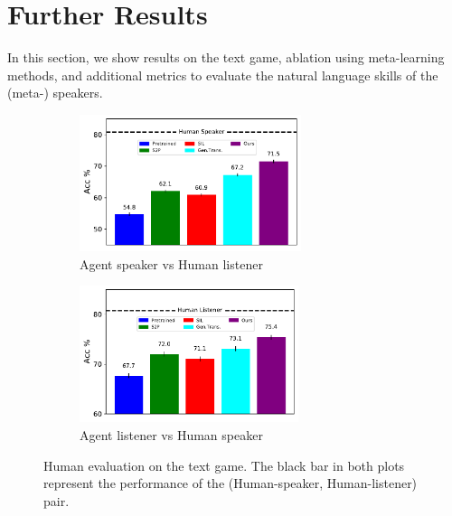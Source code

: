 \documentclass{article}
\begin{document}
\section{Further Results}
\label{subsec:app-res}
In this section, we show results on the text game, ablation using meta-learning methods, and additional metrics to evaluate the natural language skills of the (meta-) speakers.

\begin{figure}
    \centering
    \begin{subfigure}{0.49\linewidth}
    \includegraphics[width=\linewidth, height=4cm]{figs/meta-speaker-human-eval-text.pdf}
    \caption{Agent speaker vs Human listener}
    \label{fig:meta-speaker-human-image-text}
    \end{subfigure}
    \begin{subfigure}{0.49\linewidth}
    \includegraphics[width=\linewidth, height=4cm]{figs/meta-listener-human-eval-text.pdf}
    \caption{Agent listener vs Human speaker}
    \label{fig:meta-listener-human-image-text}
    \end{subfigure}
    \caption{Human evaluation on the text game. The black bar in both plots represent the performance of the (Human-speaker, Human-listener) pair.}
    \label{fig:meta-human-text}
\end{figure}
\end{document}
